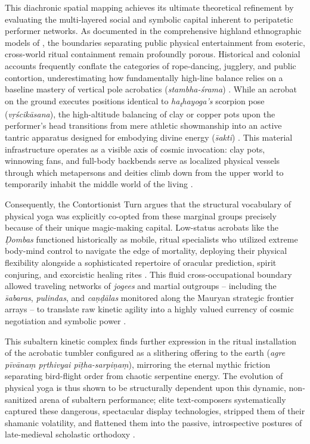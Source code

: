 \documentclass[11pt,twoside,letterpaper]{article}
\begin{document}
This diachronic spatial mapping achieves its ultimate theoretical refinement by evaluating the multi-layered social and symbolic capital inherent to peripatetic performer networks. As documented in the comprehensive highland ethnographic models of \citet{Berger2023}, the boundaries separating public physical entertainment from esoteric, cross-world ritual containment remain profoundly porous. Historical and colonial accounts frequently conflate the categories of rope-dancing, jugglery, and public contortion, underestimating how fundamentally high-line balance relies on a baseline mastery of vertical pole acrobatics (\textit{stambha-\'srama}) \citep{Berger2023}. While an acrobat on the ground executes positions identical to \textit{ha\textsubscript{t}hayoga's} scorpion pose (\textit{v\d{r}\'scik\={a}sana}), the high-altitude balancing of clay or copper pots upon the performer’s head transitions from mere athletic showmanship into an active tantric apparatus designed for embodying divine energy (\textit{\={s}akti}) \citep{Berger2023}. This material infrastructure operates as a visible axis of cosmic invocation: clay pots, winnowing fans, and full-body backbends serve as localized physical vessels through which metapersons and deities climb down from the upper world to temporarily inhabit the middle world of the living \citep[397]{Berger2023}. 

Consequently, the Contortionist Turn argues that the structural vocabulary of physical yoga was explicitly co-opted from these marginal groups precisely because of their unique magic-making capital. Low-status acrobats like the \textit{\d{D}ombas} functioned historically as mobile, ritual specialists who utilized extreme body-mind control to navigate the edge of mortality, deploying their physical flexibility alongside a sophisticated repertoire of oracular prediction, spirit conjuring, and exorcistic healing rites \citep{Berger2023, Olivelle2011}. This fluid cross-occupational boundary allowed traveling networks of \textit{jogees} and martial outgroups -- including the \textit{\={s}abaras}, \textit{pulindas}, and \textit{ca\d{n}\d{d}\={a}las} monitored along the Mauryan strategic frontier arrays -- to translate raw kinetic agility into a highly valued currency of cosmic negotiation and symbolic power \citep{Kangle1969}. 

This subaltern kinetic complex finds further expression in the ritual installation of the acrobatic tumbler configured as a slithering offering to the earth (\textit{agre p\={i}v\={a}na\d{m} p\d{r}thivyai p\={i}\d{t}ha-sarpi\d{n}a\d{m}}), mirroring the eternal mythic friction separating bird-flight order from chaotic serpentine energy. The evolution of physical yoga is thus shown to be structurally dependent upon this dynamic, non-sanitized arena of subaltern performance; elite text-composers systematically captured these dangerous, spectacular display technologies, stripped them of their shamanic volatility, and flattened them into the passive, introspective postures of late-medieval scholastic orthodoxy \citep{Birch2024, Mallinson2017, Wujastyk2025}.
\end{document}
